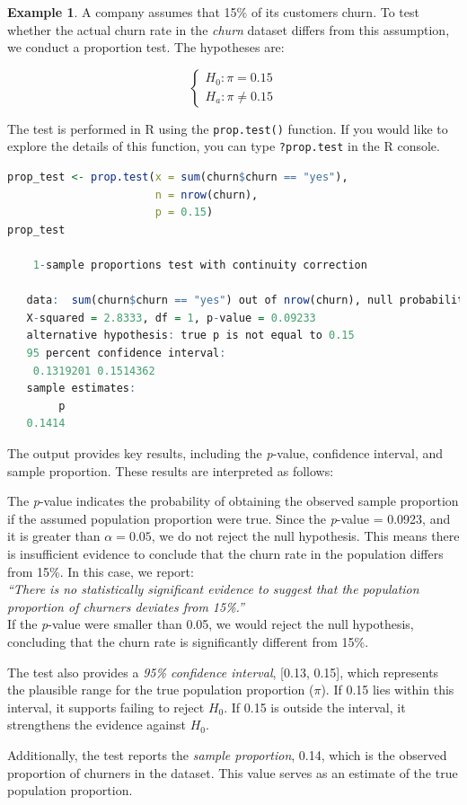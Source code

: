 \documentclass[
  11pt,
]{book}
\newcommand{\passthrough}[1]{#1}
\theoremstyle{definition}
\theoremstyle{definition}
\newtheorem{example}{Example}[chapter]
\theoremstyle{definition}
\theoremstyle{definition}
\theoremstyle{remark}
\begin{document}
\begin{example}
\protect\hypertarget{exm:ex-test-proportion}{}\label{exm:ex-test-proportion}A company assumes that 15\% of its customers churn. To test whether the actual churn rate in the \emph{churn} dataset differs from this assumption, we conduct a proportion test. The hypotheses are:

\[
\begin{cases}
H_0: \pi  =   0.15 \\ 
H_a: \pi \neq 0.15 
\end{cases}
\]

The test is performed in R using the \passthrough{\lstinline!prop.test()!} function. If you would like to explore the details of this function, you can type \passthrough{\lstinline!?prop.test!} in the R console.

\begin{lstlisting}[language=R]
prop_test <- prop.test(x = sum(churn$churn == "yes"), 
                       n = nrow(churn), 
                       p = 0.15)
prop_test
   
    1-sample proportions test with continuity correction
   
   data:  sum(churn$churn == "yes") out of nrow(churn), null probability 0.15
   X-squared = 2.8333, df = 1, p-value = 0.09233
   alternative hypothesis: true p is not equal to 0.15
   95 percent confidence interval:
    0.1319201 0.1514362
   sample estimates:
        p 
   0.1414
\end{lstlisting}

The output provides key results, including the \emph{p}-value, confidence interval, and sample proportion. These results are interpreted as follows:

The \emph{p}-value indicates the probability of obtaining the observed sample proportion if the assumed population proportion were true. Since the \emph{p}-value = 0.0923, and it is greater than \(\alpha = 0.05\), we do not reject the null hypothesis. This means there is insufficient evidence to conclude that the churn rate in the population differs from 15\%. In this case, we report:\\
\emph{``There is no statistically significant evidence to suggest that the population proportion of churners deviates from 15\%.''}\\
If the \emph{p}-value were smaller than 0.05, we would reject the null hypothesis, concluding that the churn rate is significantly different from 15\%.

The test also provides a \emph{95\% confidence interval}, {[}0.13, 0.15{]}, which represents the plausible range for the true population proportion (\(\pi\)). If 0.15 lies within this interval, it supports failing to reject \(H_0\). If 0.15 is outside the interval, it strengthens the evidence against \(H_0\).

Additionally, the test reports the \emph{sample proportion}, 0.14, which is the observed proportion of churners in the dataset. This value serves as an estimate of the true population proportion.
\end{example}
\end{document}
